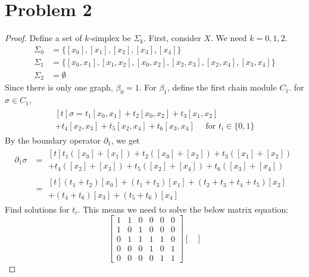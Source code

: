 \section*{Problem 2}
	\begin{proof}
		Define a set of $k$-simplex be $\Sigma_k$. First, consider $X$. We need $k=0,1,2$.
		\begin{align*}
			\Sigma_0 &= \{[x_0], [x_1], [x_2], [x_3], [x_4]\}\\
			\Sigma_1 &= \{[x_0,x_1], [x_1,x_2], [x_0,x_2], [x_2,x_3], [x_2,x_4], [x_3,x_4]\}\\
			\Sigma_2 &= \emptyset
		\end{align*}
		Since there is only one graph, $\beta_0 = 1$. For $\beta_1$, define the first chain module $C_1$. for $\sigma\in C_1$,
		\begin{align*}
			\begin{multlined}[t]
				\sigma = t_1[x_0, x_1] + t_2[x_0,x_2] + t_3[x_1,x_2]\\
				+ t_4[x_2,x_3] + t_5[x_2,x_4] + t_6[x_3,x_4] \quad\mbox{ for } t_i\in \{0, 1\}
			\end{multlined}
		\end{align*}
		By the boundary operator $\partial_1$, we get
		\begin{align*}
			\partial_1\sigma &= \begin{multlined}[t]
				t_1([x_0]+[x_1]) + t_2([x_0]+[x_2]) + t_3([x_1]+[x_2])\\
				+ t_4([x_2]+[x_3]) + t_5([x_2]+[x_4]) + t_6([x_3]+[x_4])
			\end{multlined}\\
			&= \begin{multlined}[t]
				(t_1+t_2)[x_0] + (t_1+t_3)[x_1] + (t_2+t_3+t_4+t_5)[x_2]\\
				+ (t_4+t_6)[x_3] + (t_5+t_6)[x_4]
			\end{multlined}
		\end{align*}
		Find solutions for $t_i$. This means we need to solve the below matrix equation:
		\begin{equation*}
			\begin{bmatrix} 
				1 & 1 & 0 & 0 & 0 & 0 \\
				1 & 0 & 1 & 0 & 0 & 0 \\
				0 & 1 & 1 & 1 & 1 & 0 \\
				0 & 0 & 0 & 1 & 0 & 1 \\
				0 & 0 & 0 & 0 & 1 & 1
			\end{bmatrix}
			\begin{bmatrix} 

\end{bmatrix}
\end{equation*}
\end{proof}
